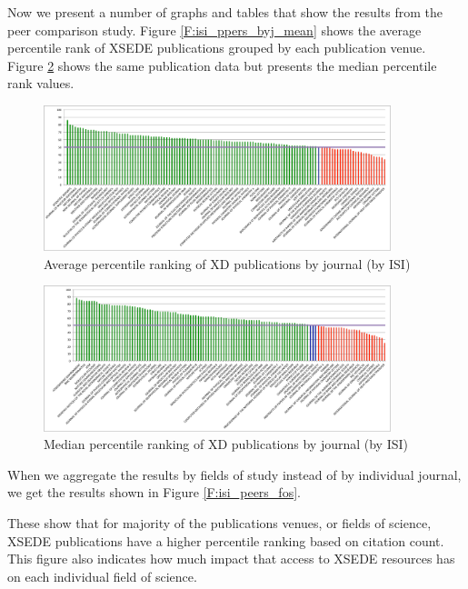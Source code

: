 \documentclass{sig-alternate}
\begin{document}
Now we present a number of graphs and tables that show the results from the peer comparison study. Figure \ref{F:isi_ppers_byj_mean} shows the average percentile rank
of XSEDE publications grouped by each publication venue. Figure \ref{F:isi_peers_byj_median}
shows the same publication data but presents the median percentile rank values.

\begin{figure}[htb!]
  \centering
    \includegraphics[width=0.9\textwidth]{images/isi_peers_byj_mean.pdf}
    \caption{Average percentile ranking of XD publications by journal (by ISI)}
    \label{F:isi_peers_byj_mean}
\end{figure}

\begin{figure}[htb!]
  \centering
    \includegraphics[width=0.9\textwidth]{images/isi_peers_byj_median.pdf}
    \caption{Median percentile ranking of XD publications by journal (by ISI)}
    \label{F:isi_peers_byj_median}
\end{figure}

When we aggregate the results by fields of study instead of by individual journal, we get
the results shown in Figure \ref{F:isi_peers_fos}.

These show that for majority of the publications venues, or fields of science, XSEDE publications
have a higher percentile ranking based on citation count. This figure also indicates how much impact that access to XSEDE resources has on each individual field of science.
\end{document}

